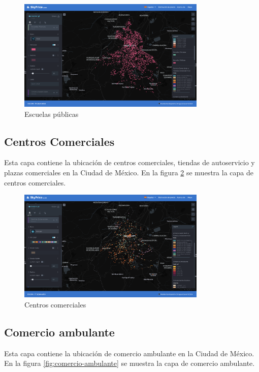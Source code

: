 \begin{figure}[H]
    \centering
    \includegraphics[width=0.8\textwidth]{imagenes/05-mapa-interactivo/escuelas-publicas.png}
    \caption{Escuelas públicas}
    \label{fig:escuelas-publicas}
\end{figure}

\subsection{Centros Comerciales}
Esta capa contiene la ubicación de centros comerciales, tiendas de autoservicio y
plazas comerciales en la Ciudad de México. En la figura \ref{fig:centros-comerciales}
se muestra la capa de centros comerciales.

\begin{figure}[H]
    \centering
    \includegraphics[width=0.8\textwidth]{imagenes/05-mapa-interactivo/centros-comerciales.png}
    \caption{Centros comerciales}
    \label{fig:centros-comerciales}
\end{figure}

\subsection{Comercio ambulante}
Esta capa contiene la ubicación de comercio ambulante en la Ciudad de México. En
la figura \ref{fig:comercio-ambulante} se muestra la capa de comercio ambulante.

